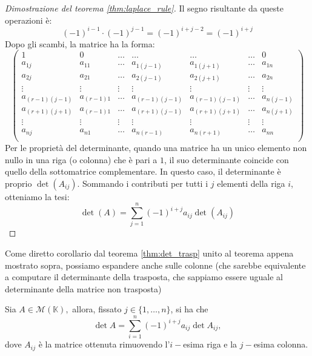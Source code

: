 \begin{proof}[Dimostrazione del teorema \ref{thm:laplace_rule}]
Il segno risultante da queste operazioni è:
\[
(-1)^{i-1} \cdot (-1)^{j-1} = (-1)^{i+j-2} = (-1)^{i+j}
\]
Dopo gli scambi, la matrice ha la forma:
\[
\begin{pmatrix} 
1 & 0 & \ldots & \ldots & \ldots & \ldots & 0 \\ 
a_{1j} & a_{11} & \ldots & a_{1(j-1)} & a_{1(j+1)} & \ldots & a_{1n} \\
a_{2j} & a_{21} & \ldots & a_{2(j-1)} & a_{2(j+1)} & \ldots & a_{2n} \\ 
\vdots & \vdots & \vdots & \vdots & \vdots & \vdots & \vdots \\
a_{(r-1)(j-1)} & a_{(r-1)1} & \ldots & a_{(r-1)(j-1)} & a_{(r-1)(j-1)} & \ldots & a_{n(j-1)} \\
a_{(r+1)(j+1)} & a_{(r-1)1} & \ldots & a_{(r+1)(j-1)} & a_{(r+1)(j+1)} & \ldots & a_{n(j+1)} \\
\vdots & \vdots & \vdots & \vdots & \vdots & \vdots & \vdots \\
a_{nj} & a_{n1} & \ldots & a_{n(r-1)} & a_{n(r+1)} & \ldots & a_{nn}  \\
\end{pmatrix}
\]
Per le proprietà del determinante, quando una matrice ha un unico elemento non nullo in una riga (o colonna) che è pari a $1$, il suo determinante coincide con quello della sottomatrice complementare. In questo caso, il determinante è proprio $\det(A_{ij})$.
Sommando i contributi per tutti i $j$ elementi della riga $i$, otteniamo la tesi:
\[
\det(A) = \sum_{j=1}^n (-1)^{i+j} a_{ij} \det(A_{ij})
\]
\end{proof}
Come diretto corollario dal teorema \ref{thm:det_trasp} unito al teorema appena mostrato sopra, possiamo espandere anche sulle colonne (che sarebbe equivalente a computare il determinante della trasposta, che sappiamo essere uguale al determinante della matrice non trasposta)
\begin{cor}
    Sia $A \in \mathcal{M}(\mathbb{K}),$ allora, fissato $j \in \{ 1, \ldots, n \}$, si ha che
    $$
        \det{A} = \sum_{i=1}^n (-1)^{i+j} a_{ij} \det{A_{ij}},
    $$
    dove $A_{ij}$ è la matrice ottenuta rimuovendo l'$i-$esima riga e la $j-$esima colonna.
\end{cor}

